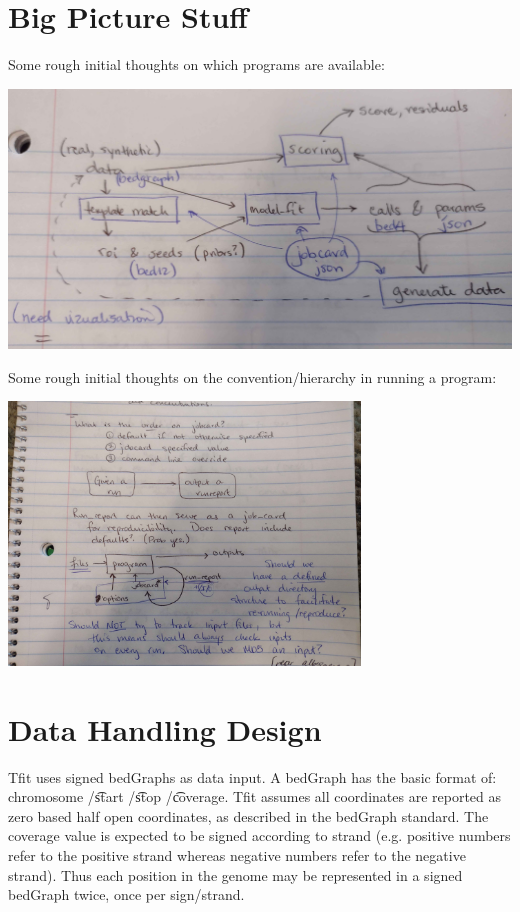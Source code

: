 \documentclass[11pt]{article}
\begin{document}
\section{Big Picture Stuff}
Some rough initial thoughts on which programs are available:

\includegraphics[width=\textwidth]{figs/ProgramsNotes.jpg}

Some rough initial thoughts on the convention/hierarchy in running a program:

\includegraphics[width=0.7\textwidth]{figs/RunNotes.jpg}


\section{Data Handling Design}
Tfit uses signed bedGraphs as data input.  A bedGraph has the basic format of: 
chromosome /\t start /\t stop /\t coverage.  Tfit assumes all coordinates are
reported as zero based half open coordinates, as described in the bedGraph 
standard.  
The coverage value is expected to be signed according to strand (e.g. positive 
numbers refer to the positive strand whereas negative numbers refer to the 
negative strand).  Thus each position in the genome may be represented in a 
signed bedGraph twice, once per sign/strand.
\end{document}
